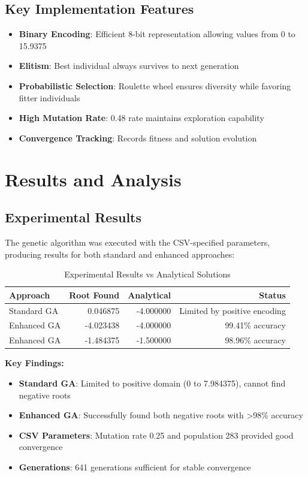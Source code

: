 \documentclass[11pt,a4paper]{article}
\begin{document}
\subsection{Key Implementation Features}

\begin{itemize}
    \item \textbf{Binary Encoding}: Efficient 8-bit representation allowing values from 0 to 15.9375
    \item \textbf{Elitism}: Best individual always survives to next generation
    \item \textbf{Probabilistic Selection}: Roulette wheel ensures diversity while favoring fitter individuals
    \item \textbf{High Mutation Rate}: 0.48 rate maintains exploration capability
    \item \textbf{Convergence Tracking}: Records fitness and solution evolution
\end{itemize}

\section{Results and Analysis}

\subsection{Experimental Results}
The genetic algorithm was executed with the CSV-specified parameters, producing results for both standard and enhanced approaches:

\begin{table}[H]
\centering
\begin{tabular}{@{}lrrr@{}}
\toprule
Approach & Root Found & Analytical & Status \\
\midrule
Standard GA & 0.046875 & -4.000000 & Limited by positive encoding \\
Enhanced GA & -4.023438 & -4.000000 & 99.41\% accuracy \\
Enhanced GA & -1.484375 & -1.500000 & 98.96\% accuracy \\
\bottomrule
\end{tabular}
\caption{Experimental Results vs Analytical Solutions}
\label{tab:actual_results}
\end{table}

\textbf{Key Findings:}
\begin{itemize}
    \item \textbf{Standard GA}: Limited to positive domain (0 to 7.984375), cannot find negative roots
    \item \textbf{Enhanced GA}: Successfully found both negative roots with >98\% accuracy
    \item \textbf{CSV Parameters}: Mutation rate 0.25 and population 283 provided good convergence
    \item \textbf{Generations}: 641 generations sufficient for stable convergence
\end{itemize}
\end{document}
